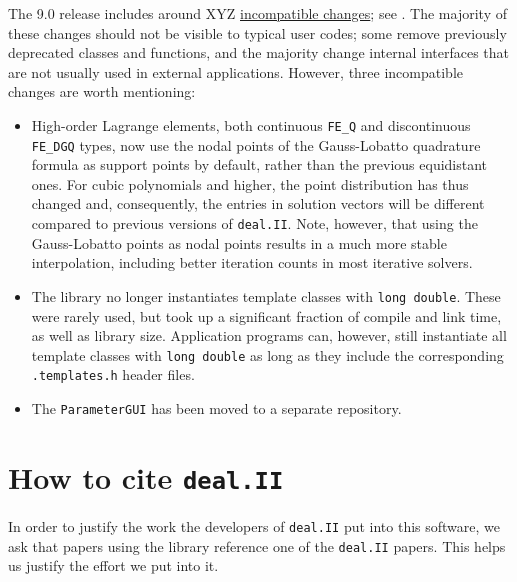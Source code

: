 \documentclass{ansarticle-preprint}
\newcommand{\specialword}[1]{\texttt{#1}}
\newcommand{\dealii}{{\specialword{deal.II}}}
\begin{document}
The 9.0 release includes around XYZ
\href{https://www.dealii.org/developer/doxygen/deal.II/changes_between_8_5_and_9_0.html}{
incompatible changes}; see \cite{changes90}. The majority of these changes
should not be visible to typical user codes; some remove previously
deprecated classes and functions, and the majority change internal
interfaces that are not usually used in external applications. However, three
incompatible changes are worth mentioning:
\begin{itemize}
  \item High-order Lagrange elements, both continuous \verb!FE_Q! and
    discontinuous \verb!FE_DGQ! types, now use the nodal points of the
    Gauss-Lobatto quadrature formula as support points by default, rather than the
    previous equidistant ones. For cubic polynomials and higher, the point
    distribution has thus changed and, consequently, the entries in
    solution vectors will be different compared to previous
    versions of \dealii{}. Note, however, that using the Gauss-Lobatto points as nodal
    points results in a much more stable interpolation, including better
    iteration counts in most iterative solvers.
  \item
    The library no longer instantiates template classes with \texttt{long
    double}. These were rarely used, but took up a significant
    fraction of compile and link time, as well as library
    size. Application programs can, however, still instantiate all
    template classes with \texttt{long
    double} as long as they include the corresponding \texttt{.templates.h}
    header files.
  \item
    The \texttt{ParameterGUI} has been moved to a separate repository.
\end{itemize}



\section{How to cite \dealii{}}\label{sec:cite}

In order to justify the work the developers of \dealii{} put into this
software, we ask that papers using the library reference one of the
\dealii{} papers. This helps us justify the effort we put into it.
\end{document}
